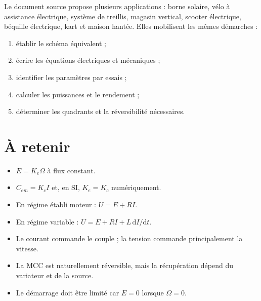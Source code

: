 Le document source propose plusieurs applications : borne solaire, vélo à assistance électrique,
système de treillis, magasin vertical, scooter électrique, béquille électrique, kart et maison
hantée. Elles mobilisent les mêmes démarches :
\begin{enumerate}
  \item établir le schéma équivalent ;
  \item écrire les équations électriques et mécaniques ;
  \item identifier les paramètres par essais ;
  \item calculer les puissances et le rendement ;
  \item déterminer les quadrants et la réversibilité nécessaires.
\end{enumerate}

\section{À retenir}\label{sec:mcc-retenir}

\begin{itemize}
  \item $E=K_e\Omega$ à flux constant.
  \item $C_{em}=K_cI$ et, en SI, $K_e=K_c$ numériquement.
  \item En régime établi moteur : $U=E+RI$.
  \item En régime variable : $U=E+RI+L\,\mathrm dI/\mathrm dt$.
  \item Le courant commande le couple ; la tension commande principalement la vitesse.
  \item La MCC est naturellement réversible, mais la récupération dépend du variateur et de la source.
  \item Le démarrage doit être limité car $E=0$ lorsque $\Omega=0$.
\end{itemize}
